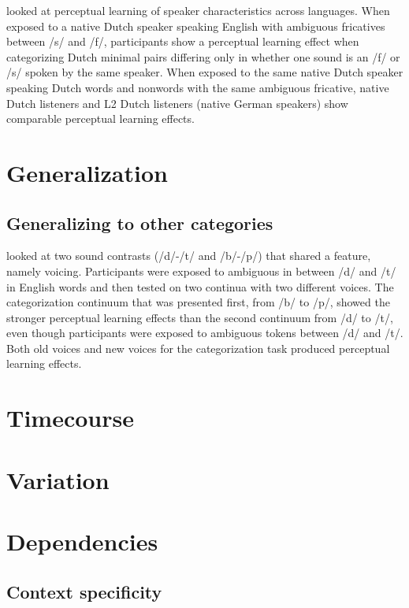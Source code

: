 \citet{Reinisch2013} looked at perceptual learning of speaker characteristics across languages.  
When exposed to a native Dutch speaker speaking English with ambiguous fricatives between /s/ and /f/, participants show a perceptual learning effect when categorizing Dutch minimal pairs differing only in whether one sound is an /f/ or /s/ spoken by the same speaker.  
When exposed to the same native Dutch speaker speaking Dutch words and nonwords with the same ambiguous fricative, native Dutch listeners and L2 Dutch listeners (native German speakers) show comparable perceptual learning effects.

\section{Generalization}

\subsection{Generalizing to other categories}

\citet{Kraljic2006} looked at two sound contrasts (/d/-/t/ and /b/-/p/) that shared a feature, namely voicing.  
Participants were exposed to ambiguous in between /d/ and /t/ in English words and then tested on two continua with two different voices.  
The categorization continuum that was presented first, from /b/ to /p/, showed the stronger perceptual learning effects than the second continuum from /d/ to /t/, even though participants were exposed to ambiguous tokens between /d/ and /t/. 
 Both old voices and new voices for the categorization task produced perceptual learning effects.

\citet{Reinisch2011}

\citet{Reinisch2014}

\section{Timecourse}

\citet{Vroomen2004} \cite{Kleinschmidt2011}

\citet{Trude2012}

\section{Variation}

\citet{Sumner2011}


\section{Dependencies}

\subsection{Context specificity}

\citet{Kraljic2008a}

\citet{Kraljic2008}

\citet{Clare2014}